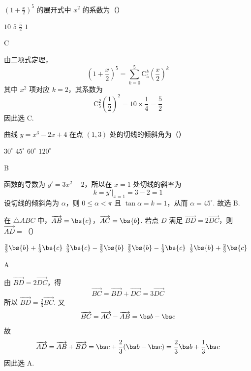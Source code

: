 \begin{problem}
\(\left(1 + \frac{x}{2}\right)^5\) 的展开式中 \(x^2\) 的系数为（\quad）

\choices
    {\(10\)}
    {\(5\)}
    {\(\frac{5}{2}\)}
    {\(1\)}
\end{problem}

\begin{answer}
C
\end{answer}

\begin{solution}
由二项式定理，
\[
\left(1+\frac{x}{2}\right)^5=\sum_{k=0}^{5}\mathrm C_5^k\left(\frac{x}{2}\right)^k
\]
其中 \(x^2\) 项对应 \(k=2\)，其系数为
\[
\mathrm C_5^2\left(\frac{1}{2}\right)^2=10\times\frac14=\frac52
\]
因此选 C.
\end{solution}

\begin{problem}
曲线 \( y = x^{3} - 2x + 4 \) 在点 \((1, 3)\) 处的切线的倾斜角为（\quad）

\choices
    {\(30^{\circ}\)}
    {\(45^{\circ}\)}
    {\(60^{\circ}\)}
    {\(120^{\circ}\)}
\end{problem}

\begin{answer}
B
\end{answer}

\begin{solution}
函数的导数为 \(y'=3x^2-2\)，所以在 \(x=1\) 处切线的斜率为
\[
k=y'\big|_{x=1}=3-2=1
\]
设切线的倾斜角为 \(\alpha\)，则 \(0\leqslant\alpha<\pi\) 且 \(\tan\alpha=k=1\)，从而 \(\alpha=45^{\circ}\). 故选 B.
\end{solution}

\begin{problem}
在 \(\triangle ABC\) 中，\(\overrightarrow{AB} = \bs{c}\)，\(\overrightarrow{AC} = \bs{b}\). 若点 \(D\) 满足 \(\overrightarrow{BD} = 2\overrightarrow{DC}\)，则 \(\overrightarrow{AD} =\)（\quad）

\choices
    {\(\frac{2}{3} \bs{b} + \frac{1}{3} \bs{c}\)}
    {\(\frac{5}{3} \bs{c} - \frac{2}{3} \bs{b}\)}
    {\(\frac{2}{3} \bs{b} - \frac{1}{3} \bs{c}\)}
    {\(\frac{1}{3} \bs{b} + \frac{2}{3} \bs{c}\)}
\end{problem}

\begin{answer}
A
\end{answer}

\begin{solution}
由 \(\overrightarrow{BD}=2\overrightarrow{DC}\)，得
\[
\overrightarrow{BC}=\overrightarrow{BD}+\overrightarrow{DC}=3\overrightarrow{DC}
\]
所以 \(\overrightarrow{BD}=\frac23\overrightarrow{BC}\). 又
\[
\overrightarrow{BC}=\overrightarrow{AC}-\overrightarrow{AB}=\bs b-\bs c
\]
故
\[
\overrightarrow{AD}=\overrightarrow{AB}+\overrightarrow{BD}
=\bs c+\frac23(\bs b-\bs c)
=\frac23\bs b+\frac13\bs c
\]
因此选 A.
\end{solution}

